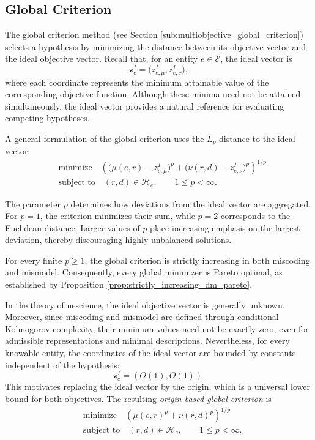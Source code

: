 
\subsection*{Global Criterion}
\label{sec:nescience_global_criterion}

The global criterion method (see Section \ref{sub:multiobjective_global_criterion}) selects a hypothesis by minimizing the distance between its objective vector and the ideal objective vector. Recall that, for an entity $e\in\mathcal E$, the ideal vector is
\[
\mathbf z_e^I = \bigl(z_{e,\mu}^I,z_{e,\nu}^I\bigr),
\]
where each coordinate represents the minimum attainable value of the corresponding objective function. Although these minima need not be attained simultaneously, the ideal vector provides a natural reference for evaluating competing hypotheses.

A general formulation of the global criterion uses the $L_p$ distance to the ideal vector:
\begin{align*}
& \text{minimize} \quad \left( \bigl(\mu(e,r)-z_{e,\mu}^I\bigr)^p
  + \bigl(\nu(r,d)-z_{e,\nu}^I\bigr)^p \right)^{1/p}\\
& \text{subject to} \quad (r,d)\in\mathcal H_e, \qquad 1\leq p<\infty.
\end{align*}

The parameter $p$ determines how deviations from the ideal vector are aggregated. For $p=1$, the criterion minimizes their sum, while $p=2$ corresponds to the Euclidean distance. Larger values of $p$ place increasing emphasis on the largest deviation, thereby discouraging highly unbalanced solutions.

For every finite $p\geq1$, the global criterion is strictly increasing in both miscoding and mismodel. Consequently, every global minimizer is Pareto optimal, as established by Proposition \ref{prop:strictly_increasing_dm_pareto}.

In the theory of nescience, the ideal objective vector is generally unknown. Moreover, since miscoding and mismodel are defined through conditional Kolmogorov complexity, their minimum values need not be exactly zero, even for admissible representations and minimal descriptions. Nevertheless, for every knowable entity, the coordinates of the ideal vector are bounded by constants independent of the hypothesis:
\[
\mathbf z_e^I=(O(1),O(1)).
\]
This motivates replacing the ideal vector by the origin, which is a universal lower bound for both objectives. The resulting \emph{origin-based global criterion} is
\begin{align*}
& \text{minimize} \quad \left( \mu(e,r)^p+\nu(r,d)^p \right)^{1/p} \\
& \text{subject to} \quad (r,d)\in\mathcal H_e, \qquad 1\leq p<\infty.
\end{align*}

